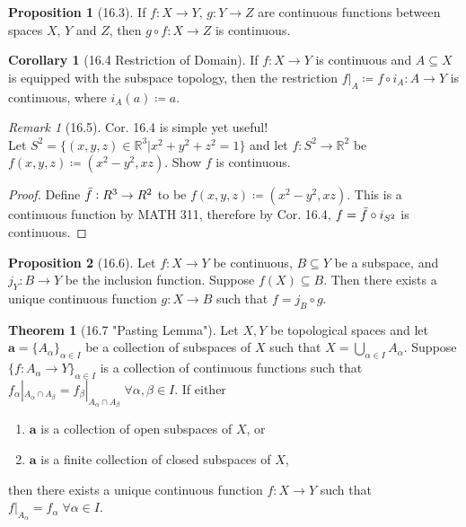 \documentclass{article}
\newcommand{\R}{\ensuremath{\mathbb{R}}}
\newcommand{\coleq}{\ensuremath{\coloneqq}}
\newcommand{\func}[3]{\ensuremath{#1: #2 \to #3}}
\newcommand{\Union}{\bigcup}
\newcommand{\inter}{\cap}
\renewcommand{\Subset}{\subseteq}
\theoremstyle{definition}
\newtheorem*{cor}{Corollary}
\newtheorem*{thm}{Theorem}
\newtheorem*{prop}{Proposition}
\theoremstyle{remark}
\newtheorem*{rmk}{Remark}
\begin{document}
{        \begin{prop}[16.3]
            If $\func{f}{X}{Y}, \, \func{g}{Y}{Z}$ are continuous functions between spaces $X, \, Y$ and $Z$, then $\func{g \circ f}{X}{Z}$ is continuous.
        \end{prop}
        
        \begin{cor}[16.4 Restriction of Domain]
            If $\func{f}{X}{Y}$ is continuous and $A \Subset X$ is equipped with the subspace topology, then the restriction $f|_A \coleq \func{f\circ i_A}{A}{Y}$ is continuous, where $i_A(a) \coleq a$.
        \end{cor}
        
        \begin{rmk}[16.5]
            Cor. 16.4 is simple yet useful!\\
            Let $S^2=\{(x,y,z)\in \R^3|x^2+y^2+z^2=1\}$ and let $\func{f}{S^2}{\R^2}$ be $f(x,y,z)\coleq(x^2-y^2,xz)$. Show $f$ is continuous.
            \begin{proof}
                Define $\func{\Bar{f}}{R^3}{R^2}$ to be $f(x,y,z)\coleq(x^2-y^2,xz)$. This is a continuous function by MATH 311, therefore by Cor. 16.4, $f=\Bar{f}\circ i_{S^2}$ is continuous.
            \end{proof}
        \end{rmk}
        
        \begin{prop}[16.6]
            Let $\func{f}{X}{Y}$ be continuous, $B \Subset Y$ be a subspace, and $\func{j_Y}{B}{Y}$ be the inclusion function. Suppose $f(X) \Subset B$. Then there exists a unique continuous function $\func{g}{X}{B}$ such that $f=j_B\circ g$.
        \end{prop}
        
        \begin{thm}[16.7 "Pasting Lemma"]
                Let $X,Y$ be topological spaces and let $\mathbf{a}=\{A_\alpha\}_{\alpha \in I}$ be a collection of subspaces of $X$ such that $X=\Union\limits_{\alpha\in I} A_\alpha$. Suppose $\{\func{f}{A_\alpha}{Y}\}_{\alpha \in I}$ is a collection of continuous functions such that $f_\alpha|_{A_\alpha \inter A_\beta} = f_\beta|_{A_\alpha \inter A_\beta} \; \forall \alpha,\beta \in I$. If either
                \begin{enumerate}
                    \item $\mathbf{a}$ is a collection of open subspaces of $X$, or
                    \item $\mathbf{a}$ is a finite collection of closed subspaces of $X$,
                \end{enumerate}
                then there exists a unique continuous function $\func{f}{X}{Y}$ such that $f|_{A_\alpha}=f_\alpha \; \forall \alpha\in I$.
        \end{thm}
    }
\end{document}
